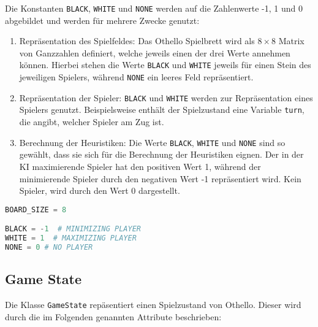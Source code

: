 Die Konstanten \passthrough{\lstinline!BLACK!},
\passthrough{\lstinline!WHITE!} und \passthrough{\lstinline!NONE!}
werden auf die Zahlenwerte -1, 1 und 0 abgebildet und werden für mehrere
Zwecke genutzt:

\begin{enumerate}
\def\labelenumi{\arabic{enumi}.}
\tightlist
\item
  Repräsentation des Spielfeldes: Das Othello Spielbrett wird als
  \(8\times 8\) Matrix von Ganzzahlen definiert, welche jeweils einen
  der drei Werte annehmen können. Hierbei stehen die Werte
  \passthrough{\lstinline!BLACK!} und \passthrough{\lstinline!WHITE!}
  jeweils für einen Stein des jeweiligen Spielers, während
  \passthrough{\lstinline!NONE!} ein leeres Feld repräsentiert.
\item
  Repräsentation der Spieler: \passthrough{\lstinline!BLACK!} und
  \passthrough{\lstinline!WHITE!} werden zur Repräsentation eines
  Spielers genutzt. Beispielsweise enthält der Spielzustand eine
  Variable \passthrough{\lstinline!turn!}, die angibt, welcher Spieler
  am Zug ist.
\item
  Berechnung der Heuristiken: Die Werte \passthrough{\lstinline!BLACK!},
  \passthrough{\lstinline!WHITE!} und \passthrough{\lstinline!NONE!}
  sind so gewählt, dass sie sich für die Berechnung der Heuristiken
  eignen. Der in der \ac{KI} maximierende Spieler hat den positiven Wert
  1, während der minimierende Spieler durch den negativen Wert -1
  repräsentiert wird. Kein Spieler, wird durch den Wert 0 dargestellt.
\end{enumerate}

\begin{lstlisting}[language=Python]
BOARD_SIZE = 8

BLACK = -1  # MINIMIZING PLAYER
WHITE = 1  # MAXIMIZING PLAYER
NONE = 0 # NO PLAYER
\end{lstlisting}

\hypertarget{game-state}{%
\subsection{Game State}\label{game-state}}

Die Klasse \passthrough{\lstinline!GameState!} repäsentiert einen
Spielzustand von Othello. Dieser wird durch die im Folgenden genannten
Attribute beschrieben:

